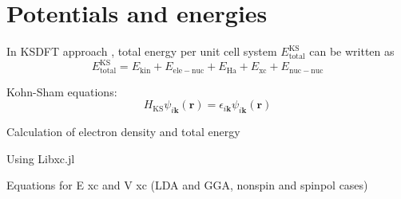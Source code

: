 \section{Potentials and energies}

In KSDFT approach \cite{Hohenberg1964,Kohn1965}, total energy per unit cell system
$E^{\mathrm{KS}}_{\mathrm{total}}$ can be written as
\begin{equation}
E^{\mathrm{KS}}_{\mathrm{total}} =
E_{\mathrm{kin}} + E_{\mathrm{ele-nuc}} +
E_{\mathrm{Ha}} + E_{\mathrm{xc}} + E_{\mathrm{nuc-nuc}}
\label{eq:E_KS_total}
\end{equation}

Kohn-Sham equations:
\begin{equation}
H_{\mathrm{KS}} \psi_{i\mathbf{k}}(\mathbf{r}) =
\epsilon_{i\mathbf{k}} \psi_{i\mathbf{k}}(\mathbf{r})
\end{equation}





Calculation of electron density and total energy

Using Libxc.jl

Equations for E xc and V xc (LDA and GGA, nonspin and spinpol cases)
